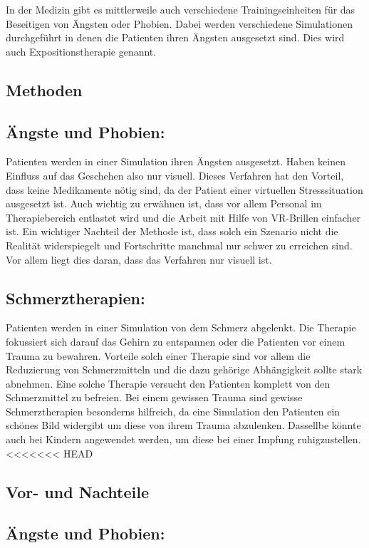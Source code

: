 
In der Medizin gibt es mittlerweile auch verschiedene Trainingseinheiten für das Beseitigen von Ängsten oder Phobien. Dabei werden verschiedene Simulationen durchgeführt in denen die Patienten ihren Ängsten ausgesetzt sind. Dies wird auch Expositionstherapie genannt.\\

\subsection{Methoden}
\subsection{Ängste und Phobien:}
Patienten werden in einer Simulation ihren Ängsten ausgesetzt. Haben keinen Einfluss auf das Geschehen also nur visuell. Dieses Verfahren hat den Vorteil, dass keine Medikamente nötig sind, da der Patient einer virtuellen Stresssituation ausgesetzt ist. Auch wichtig zu erwähnen ist, dass vor allem Personal im Therapiebereich entlastet wird und die Arbeit mit Hilfe von VR-Brillen einfacher ist. Ein wichtiger Nachteil der Methode ist, dass solch ein Szenario nicht die Realität widerspiegelt und Fortschritte manchmal nur schwer zu erreichen sind. Vor allem liegt dies daran, dass das Verfahren nur visuell ist.\\

\subsection{Schmerztherapien:}
Patienten werden in einer Simulation von dem Schmerz abgelenkt. Die Therapie fokussiert sich darauf das Gehirn zu entspannen oder die Patienten vor einem Trauma zu bewahren. Vorteile solch einer Therapie sind vor allem die Reduzierung von Schmerzmitteln und die dazu gehörige Abhängigkeit sollte stark abnehmen. Eine solche Therapie versucht den Patienten komplett von den Schmerzmittel zu befreien. Bei einem gewissen Trauma sind gewisse Schmerztherapien besonderns hilfreich, da eine Simulation den Patienten ein schönes Bild widergibt um diese von ihrem Trauma abzulenken. Dassellbe könnte auch bei Kindern angewendet werden, um diese bei einer Impfung ruhigzustellen.\\
<<<<<<< HEAD

\subsection{Vor- und Nachteile}
\subsection{Ängste und Phobien:}

